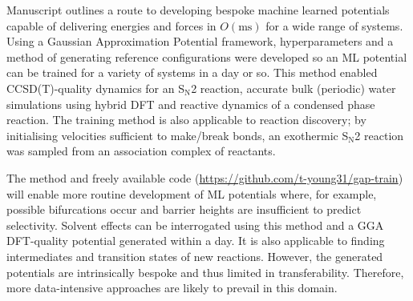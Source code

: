 \documentclass[../../main.tex]{subfiles}
\begin{document}
Manuscript  outlines a route to developing bespoke machine learned potentials capable of delivering energies and forces in $O(\text{ms})$ for a wide range of systems. Using a Gaussian Approximation Potential framework,\cite{Bartok2010} hyperparameters and a method of generating reference configurations were developed so an ML potential can be trained for a variety of systems in a day or so. This method enabled CCSD(T)-quality dynamics for an S${}_\text{N}$2 reaction, accurate bulk (periodic) water simulations using hybrid DFT and reactive dynamics of a condensed phase reaction. The training method is also applicable to reaction discovery; by initialising velocities sufficient to make/break bonds, an exothermic S${}_\text{N}$2 reaction was sampled from an association complex of reactants.

The method and freely available code ({\url{https://github.com/t-young31/gap-train}}) will enable more routine development of ML potentials where, for example, possible bifurcations occur and barrier heights are insufficient to predict selectivity.\cite{Feng2021} Solvent effects can be interrogated using this method and a GGA DFT-quality potential generated within a day. It is also applicable to finding intermediates and transition states of new reactions. However, the generated potentials are intrinsically bespoke and thus limited in transferability. Therefore, more data-intensive approaches are likely to prevail in this domain.\cite{Smith2017, Devereux2020} 


\clearpage
\end{document}
